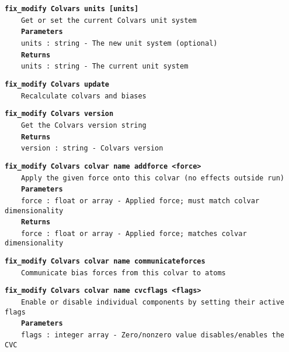 \begin{mdexampleinput}{}
\texttt{\textbf{fix\_modify Colvars units [units]}}
\\
\-~~~~\texttt{Get or set the current Colvars unit system}
\\
\-~~~~\texttt{\textbf{Parameters}}
\\
\-~~~~\texttt{units : string - The new unit system (optional)}
\\
\-~~~~\texttt{\textbf{Returns}}
\\
\-~~~~\texttt{units : string - The current unit system}
\end{mdexampleinput}
\begin{mdexampleinput}{}
\texttt{\textbf{fix\_modify Colvars update}}
\\
\-~~~~\texttt{Recalculate colvars and biases}
\end{mdexampleinput}
\begin{mdexampleinput}{}
\texttt{\textbf{fix\_modify Colvars version}}
\\
\-~~~~\texttt{Get the Colvars version string}
\\
\-~~~~\texttt{\textbf{Returns}}
\\
\-~~~~\texttt{version : string - Colvars version}
\end{mdexampleinput}
\begin{mdexampleinput}{}
\texttt{\textbf{fix\_modify Colvars colvar name addforce <force>}}
\\
\-~~~~\texttt{Apply the given force onto this colvar (no effects outside run)}
\\
\-~~~~\texttt{\textbf{Parameters}}
\\
\-~~~~\texttt{force : float or array - Applied force; must match colvar dimensionality}
\\
\-~~~~\texttt{\textbf{Returns}}
\\
\-~~~~\texttt{force : float or array - Applied force; matches colvar dimensionality}
\end{mdexampleinput}
\begin{mdexampleinput}{}
\texttt{\textbf{fix\_modify Colvars colvar name communicateforces}}
\\
\-~~~~\texttt{Communicate bias forces from this colvar to atoms}
\end{mdexampleinput}
\begin{mdexampleinput}{}
\texttt{\textbf{fix\_modify Colvars colvar name cvcflags <flags>}}
\\
\-~~~~\texttt{Enable or disable individual components by setting their active flags}
\\
\-~~~~\texttt{\textbf{Parameters}}
\\
\-~~~~\texttt{flags : integer array - Zero/nonzero value disables/enables the CVC}
\end{mdexampleinput}
